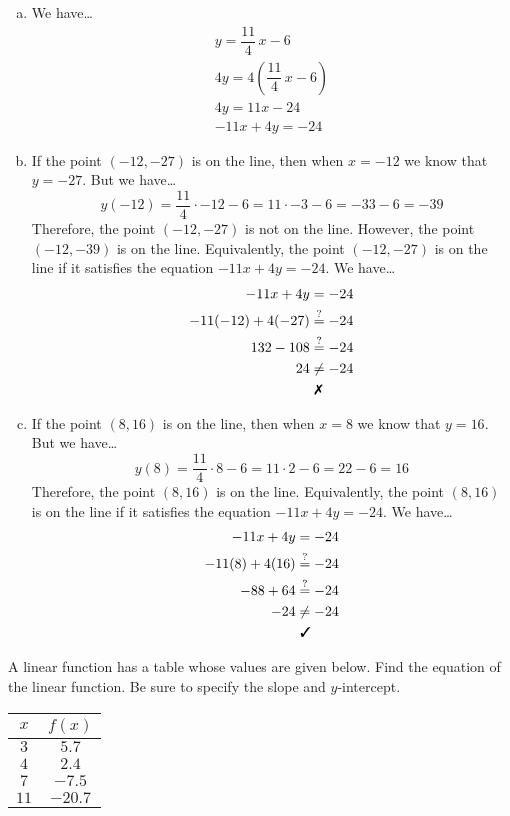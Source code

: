 \documentclass[11pt,letterpaper]{article}
\begin{document}
\sol
\begin{enumerate}[(a)]
\item We have\dots
	\[
	\begin{aligned}
	y= \dfrac{11}{4}\,x - 6 \\
	4y= 4 \left( \dfrac{11}{4}\,x - 6 \right) \\
	4y= 11x - 24 \\
	-11x + 4y= -24
	\end{aligned}
	\] 

\item If the point $(-12, -27)$ is on the line, then when $x= -12$ we know that $y= -27$. But we have\dots
	\[
	y(-12)= \dfrac{11}{4} \cdot -12 - 6= 11 \cdot -3 - 6= -33 - 6= -39
	\]
Therefore, the point $(-12, -27)$ is not on the line. However, the point $(-12, -39)$ is on the line. Equivalently, the point $(-12, -27)$ is on the line if it satisfies the equation $-11x + 4y= -24$. We have\dots
	\[
	\begin{aligned}
	-11x + 4y&= -24 \\
	-11(-12) + 4(-27)&\stackrel{?}{=} -24 \\
	132 - 108&\stackrel{?}{=} -24 \\
	24&\neq -24 \\
	&\text{ \xmark}
	\end{aligned}
	\]

\item If the point $(8, 16)$ is on the line, then when $x= 8$ we know that $y= 16$. But we have\dots
	\[
	y(8)= \dfrac{11}{4} \cdot 8 - 6= 11 \cdot 2 - 6= 22 - 6= 16
	\]
Therefore, the point $(8, 16)$ is on the line. Equivalently, the point $(8, 16)$ is on the line if it satisfies the equation $-11x + 4y= -24$. We have\dots
	\[
	\begin{aligned}
	-11x + 4y&= -24 \\
	-11(8) + 4(16)&\stackrel{?}{=} -24 \\
	-88 + 64&\stackrel{?}{=} -24 \\
	-24&\neq -24 \\
	&\text{ \cmark}
	\end{aligned}
	\] 
\end{enumerate}



\newpage



 A linear function has a table whose values are given below. Find the equation of the linear function. Be sure to specify the slope and $y$-intercept.
	\begin{table}[!ht]
	\centering
	\begin{tabular}{c|c}
	$x$ & $f(x)$ \\ \hline
	$3$ & $5.7$ \\ 
	$4$ & $2.4$ \\
	$7$ & $-7.5$ \\
	$11$ & $-20.7$
	\end{tabular}
	\end{table} \pspace
\end{document}
